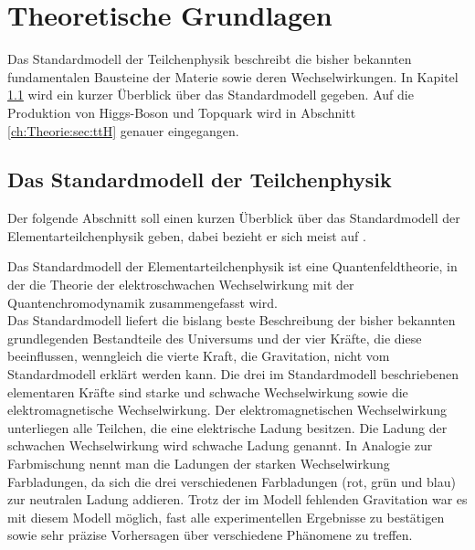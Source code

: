 \chapter{Theoretische Grundlagen}
\label{ch:Theorie}

{}

Das Standardmodell der Teilchenphysik beschreibt die bisher bekannten fundamentalen Bausteine der Materie sowie deren Wechselwirkungen. In Kapitel \ref{ch:Theorie:sec:Standardmodell} wird ein kurzer \"Uberblick \"uber das Standardmodell gegeben. Auf die Produktion von Higgs-Boson und Topquark wird in Abschnitt \ref{ch:Theorie:sec:ttH} genauer eingegangen.\\


\section{Das Standardmodell der Teilchenphysik}
\label{ch:Theorie:sec:Standardmodell}

Der folgende Abschnitt soll einen kurzen \"Uberblick \"uber das Standardmodell der Elementarteilchenphysik geben, dabei bezieht er sich meist auf \cite{SWB-39819646X}.

Das Standardmodell der Elementarteilchenphysik ist eine Quantenfeldtheorie, in der die Theorie der elektroschwachen Wechselwirkung mit der Quantenchromodynamik zusammengefasst wird.\\%
Das Standardmodell liefert die bislang beste Beschreibung der bisher bekannten grundlegenden Bestandteile des Universums und der vier Kr\"afte, die diese beeinflussen, wenngleich die vierte Kraft, die Gravitation, nicht vom Standardmodell erkl\"art werden kann. Die drei im Standardmodell beschriebenen elementaren Kr\"afte sind starke und schwache Wechselwirkung sowie die elektromagnetische Wechselwirkung. Der elektromagnetischen Wechselwirkung unterliegen alle Teilchen, die eine elektrische Ladung besitzen. Die Ladung der schwachen Wechselwirkung wird schwache Ladung genannt. In Analogie zur Farbmischung nennt man die Ladungen der starken Wechselwirkung Farbladungen, da sich die drei verschiedenen Farbladungen (rot, gr\"un und blau) zur neutralen Ladung addieren. Trotz der im Modell fehlenden Gravitation war es mit diesem Modell m\"oglich, fast alle experimentellen Ergebnisse zu best\"atigen sowie sehr pr\"azise Vorhersagen \"uber verschiedene Ph\"anomene zu treffen.

